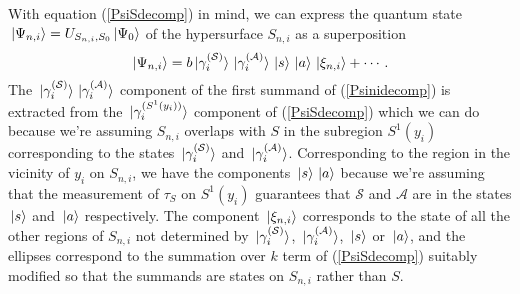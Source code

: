 With equation (\ref{PsiSdecomp}) in mind, we can express the quantum state $\ket*{\Psi_{n,i}}=U_{S_{n,i},S_0}\ket*{\Psi_0}$ %
%
of the hypersurface $S_{n,i}$ as a superposition 
\begin{equation}\label{Psinidecomp}
\ket*{\Psi_{n,i}}=b\ket*{\gamma_i^{(\mathcal{S})}}\ket*{\gamma_i^{(\mathcal{A})}}\ket*{s}\ket*{a}\ket*{\xi_{n,i}}+\cdots.
\end{equation} 
The $\ket*{\gamma_i^{(\mathcal{S})}}\ket*{\gamma_i^{(\mathcal{A})}}$ component of the first summand of (\ref{Psinidecomp}) is extracted from the $\ket*{\gamma_i^{(S^1(y_i))}}$ component of (\ref{PsiSdecomp}) which we can do because we're assuming $S_{n,i}$ overlaps with $S$ in the subregion $S^1(y_i)$ corresponding to the states $\ket*{\gamma_i^{(\mathcal{S})}}$ and $\ket*{\gamma_i^{(\mathcal{A})}}$. Corresponding to the region in the vicinity of $y_i$ on $S_{n,i}$, we have the components $\ket*{s}\ket*{a}$ because we're assuming that the measurement of $\tau_S$ on $S^1(y_i)$ guarantees that $\mathcal{S}$ and $\mathcal{A}$ are in the states $\ket*{s}$ and $\ket*{a}$ respectively. The component $\ket*{\xi_{n,i}}$ %
%
 corresponds to the state of all the other regions of $S_{n,i}$ not determined by $\ket*{\gamma_i^{(\mathcal{S})}}$, $\ket*{\gamma_i^{(\mathcal{A})}}$, $\ket*{s}$ or $\ket*{a}$, and the ellipses correspond to the summation over $k$ term of (\ref{PsiSdecomp}) suitably modified so that the summands are states on $S_{n,i}$ rather than $S$.

